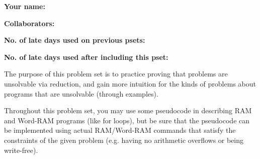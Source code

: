 \documentclass[11pt]{article}
\begin{document}


\textbf{Your name: }

\textbf{Collaborators: }

\textbf{No. of late days used on previous psets: }

\textbf{No. of late days used after including this pset: }

\vspace{1em}

\noindent The purpose of this problem set is to practice proving that problems are unsolvable via reduction, and gain more intuition for the kinds of problems about programs that are unsolvable (through examples). 

Throughout this problem set, you may use some pseudocode in describing RAM and Word-RAM programs (like for loops), but be sure that the pseudocode can be implemented using actual RAM/Word-RAM commands that satisfy the constraints of the given problem (e.g. having no arithmetic overflows or being write-free).
\end{document}
